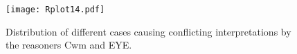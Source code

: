 \begin{figure}
 \texttt{[image: Rplot14.pdf]}
 \caption{Distribution of different cases causing conflicting interpretations by the reasoners Cwm and EYE.\label{result2}}
\end{figure}
% 
